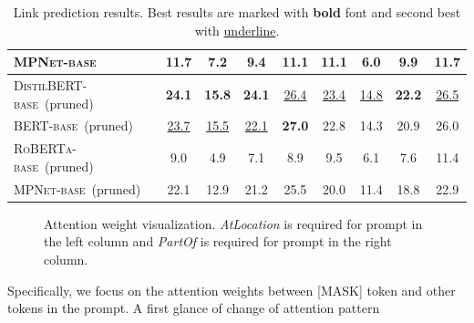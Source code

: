\begin{table}[t!]
\begin{tabular}{l|cccc|cccc}
		\textsc{MPNet-base} &11.7 &7.2 &9.4 &11.1 &11.1 &6.0 &9.9 &11.7 \\
		\midrule
		\textsc{DistilBERT-base}~(pruned) &\textbf{24.1} &\textbf{15.8} &\textbf{24.1} &\underline{26.4} &\underline{23.4} &\underline{14.8} &\textbf{22.2} &\underline{26.5} \\
		\textsc{BERT-base}~(pruned) &\underline{23.7} &\underline{15.5} &\underline{22.1} &\textbf{27.0} &22.8 &14.3 &20.9 &26.0 \\
		\textsc{RoBERTa-base}~(pruned) &9.0 &4.9 &7.1 &8.9 &9.5 &6.1 &7.6 &11.4 \\
		\textsc{MPNet-base}~(pruned) &22.1 &12.9 &21.2 &25.5 &20.0 &11.4 &18.8 &22.9 \\
		\bottomrule
	\end{tabular}
	\caption{Link prediction results. Best results are marked with \textbf{bold} font and second best with \underline{underline}.}
	\label{table:linkprediction}
\end{table}
\begin{figure}[th]
	\centering
	\caption{Attention weight visualization. \textit{AtLocation} is required for prompt in the left column and \textit{PartOf} is required for prompt in the right column.} \label{fig:attention}
\end{figure}
Specifically, we focus on the attention weights between [MASK] token and 
other tokens in the prompt. A first glance of change of attention pattern 
